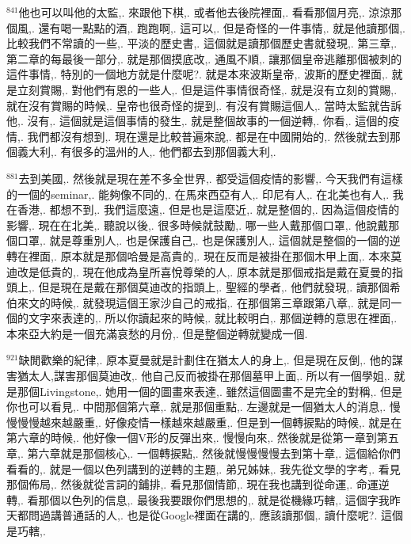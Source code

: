 \documentclass{book}
\begin{document}
$^{841}$他也可以叫他的太監,.
來跟他下棋,.
或者他去後院裡面,.
看看那個月亮,.
涼涼那個風,.
還有喝一點點的酒,.
跑跑啊,.
這可以,.
但是奇怪的一件事情,.
就是他讀那個,.
比較我們不常讀的一些,.
平淡的歷史書,.
這個就是讀那個歷史書就發現,.
第三章,.
第二章的每最後一部分,.
就是那個摸底改,.
通風不順,.
讓那個皇帝逃離那個被刺的這件事情,.
特別的一個地方就是什麼呢?.
就是本來波斯皇帝,.
波斯的歷史裡面,.
就是立刻賞賜,.
對他們有恩的一些人,.
但是這件事情很奇怪,.
就是沒有立刻的賞賜,.
就在沒有賞賜的時候,.
皇帝也很奇怪的提到,.
有沒有賞賜這個人,.
當時太監就告訴他,.
沒有,.
這個就是這個事情的發生,.
就是整個故事的一個逆轉,.
你看,.
這個的疫情,.
我們都沒有想到,.
現在還是比較普遍來說,.
都是在中國開始的,.
然後就去到那個義大利,.
有很多的溫州的人,.
他們都去到那個義大利,.

$^{881}$去到美國,.
然後就是現在差不多全世界,.
都受這個疫情的影響,.
今天我們有這樣的一個的seminar,.
能夠像不同的,.
在馬來西亞有人,.
印尼有人,.
在北美也有人,.
我在香港,.
都想不到,.
我們這麼遠,.
但是也是這麼近,.
就是整個的,.
因為這個疫情的影響,.
現在在北美,.
聽說以後,.
很多時候就鼓勵,.
哪一些人戴那個口罩,.
他說戴那個口罩,.
就是尊重別人,.
也是保護自己,.
也是保護別人,.
這個就是整個的一個的逆轉在裡面,.
原本就是那個哈曼是高貴的,.
現在反而是被掛在那個木甲上面,.
本來莫迪改是低貴的,.
現在他成為皇所喜悅尊榮的人,.
原本就是那個戒指是戴在夏曼的指頭上,.
但是現在是戴在那個莫迪改的指頭上,.
聖經的學者,.
他們就發現,.
讀那個希伯來文的時候,.
就發現這個王家沙自己的戒指,.
在那個第三章跟第八章,.
就是同一個的文字來表達的,.
所以你讀起來的時候,.
就比較明白,.
那個逆轉的意思在裡面,.
本來亞大約是一個充滿哀愁的月份,.
但是整個逆轉就變成一個.

$^{921}$缺閒歡樂的紀律,.
原本夏曼就是計劃住在猶太人的身上,.
但是現在反倒,.
他的謀害猶太人,謀害那個莫迪改,.
他自己反而被掛在那個墓甲上面,.
所以有一個學姐,.
就是那個Livingstone,.
她用一個的圖畫來表達,.
雖然這個圖畫不是完全的對稱,.
但是你也可以看見,.
中間那個第六章,.
就是那個重點,.
左邊就是一個猶太人的消息,.
慢慢慢慢越來越嚴重,.
好像疫情一樣越來越嚴重,.
但是到一個轉捩點的時候,.
就是在第六章的時候,.
他好像一個V形的反彈出來,.
慢慢向來,.
然後就是從第一章到第五章,.
第六章就是那個核心,.
一個轉捩點,.
然後就慢慢慢慢去到第十章,.
這個給你們看看的,.
就是一個以色列講到的逆轉的主題,.
弟兄姊妹,.
我先從文學的字考,.
看見那個佈局,.
然後就從言詞的鋪排,.
看見那個情節,.
現在我也講到從命運,.
命運逆轉,.
看那個以色列的信息,.
最後我要跟你們思想的,.
就是從機緣巧轄,.
這個字我昨天都問過講普通話的人,.
也是從Google裡面在講的,.
應該讀那個,.
讀什麼呢?.
這個是巧轄,.
\end{document}
